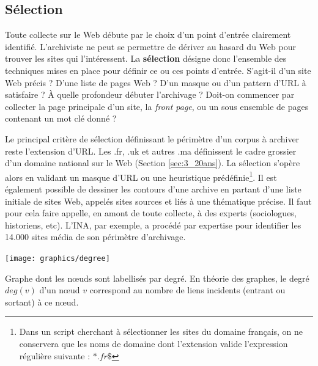 \documentclass[symmetric,justified,marginals=raggedouter]{tufte-book}
\begin{document}
\subsection{Sélection}

\noindent Toute collecte sur le Web débute par le choix d'un point d'entrée clairement identifié. L'archiviste ne peut se permettre de dériver au hasard du Web pour trouver les sites qui l'intéressent. La \textbf{sélection} désigne donc l'ensemble des techniques mises en place pour définir ce ou ces points d'entrée. S'agit-il d'un site Web précis ? D'une liste de pages Web ? D'un masque ou d'un pattern d'URL à satisfaire ? À quelle profondeur débuter l'archivage ? Doit-on commencer par collecter la page principale d'un site, la \textit{front page}, ou un sous ensemble de pages contenant un mot clé donné ?     

Le principal critère de sélection définissant le périmètre d'un corpus à archiver reste l'extension d'URL. Les .fr, .uk et autres .ma définissent le cadre grossier d'un domaine national sur le Web (Section \ref{sec:3_20ans}). La sélection s'opère alors en validant un masque d'URL ou une heuristique prédéfinie\footnote{Dans un script cherchant à sélectionner les sites du domaine français, on ne conservera que les noms de domaine dont l'extension valide l'expression régulière suivante : $*.fr\$$}. Il est également possible de dessiner les contours d'une archive en partant d'une liste initiale de sites Web, appelés sites sources et liés à une thématique précise. Il faut pour cela faire appelle, en amont de toute collecte, à des experts (sociologues, historiens, etc). L'INA, par exemple, a procédé par expertise pour identifier les 14.000 sites média de son périmètre d'archivage. 

\begin{marginfigure}%
  \texttt{[image: graphics/degree]}
  \caption{Graphe dont les nœuds sont labellisés par degré. En théorie des graphes, le degré $deg(v)$ d'un nœud $v$ correspond au nombre de liens incidents (entrant ou sortant) à ce nœud.}
  \label{fig:degree}
\end{marginfigure} 
\end{document}
